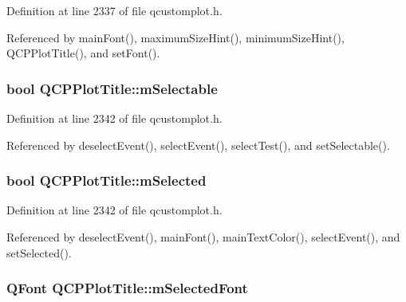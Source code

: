 Definition at line 2337 of file qcustomplot.\+h.



Referenced by main\+Font(), maximum\+Size\+Hint(), minimum\+Size\+Hint(), Q\+C\+P\+Plot\+Title(), and set\+Font().

\hypertarget{class_q_c_p_plot_title_aadefb5e2b19b1cc7deda0a55ec747884}{}
\subsubsection[{m\+Selectable}]{\setlength{\rightskip}{0pt plus 5cm}bool Q\+C\+P\+Plot\+Title\+::m\+Selectable\hspace{0.3cm}{\ttfamily [protected]}}\label{class_q_c_p_plot_title_aadefb5e2b19b1cc7deda0a55ec747884}


Definition at line 2342 of file qcustomplot.\+h.



Referenced by deselect\+Event(), select\+Event(), select\+Test(), and set\+Selectable().

\hypertarget{class_q_c_p_plot_title_afef1342a20f5ca985a20b9cfdc03d815}{}
\subsubsection[{m\+Selected}]{\setlength{\rightskip}{0pt plus 5cm}bool Q\+C\+P\+Plot\+Title\+::m\+Selected\hspace{0.3cm}{\ttfamily [protected]}}\label{class_q_c_p_plot_title_afef1342a20f5ca985a20b9cfdc03d815}


Definition at line 2342 of file qcustomplot.\+h.



Referenced by deselect\+Event(), main\+Font(), main\+Text\+Color(), select\+Event(), and set\+Selected().

\hypertarget{class_q_c_p_plot_title_a95003186c39bbab902873a8ef4cbb547}{}
\subsubsection[{m\+Selected\+Font}]{\setlength{\rightskip}{0pt plus 5cm}Q\+Font Q\+C\+P\+Plot\+Title\+::m\+Selected\+Font\hspace{0.3cm}{\ttfamily [protected]}}\label{class_q_c_p_plot_title_a95003186c39bbab902873a8ef4cbb547}


